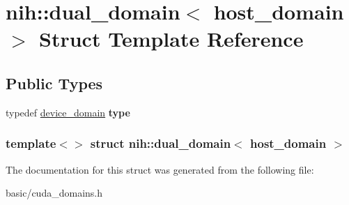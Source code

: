 \hypertarget{structnih_1_1dual__domain_3_01host__domain_01_4}{
\section{nih\-:\-:dual\-\_\-domain$<$ host\-\_\-domain $>$ \-Struct \-Template \-Reference}
\label{structnih_1_1dual__domain_3_01host__domain_01_4}
}
\subsection*{\-Public \-Types}
\begin{DoxyCompactItemize}
\item 
\hypertarget{structnih_1_1dual__domain_3_01host__domain_01_4_a1b085b484878bff1e1ebdb94bcbc9bb9}{
typedef \hyperlink{structnih_1_1device__domain}{device\-\_\-domain} {\bfseries type}}
\label{structnih_1_1dual__domain_3_01host__domain_01_4_a1b085b484878bff1e1ebdb94bcbc9bb9}

\end{DoxyCompactItemize}
\subsubsection*{template$<$$>$ struct nih\-::dual\-\_\-domain$<$ host\-\_\-domain $>$}



\-The documentation for this struct was generated from the following file\-:\begin{DoxyCompactItemize}
\item 
basic/cuda\-\_\-domains.\-h\end{DoxyCompactItemize}
